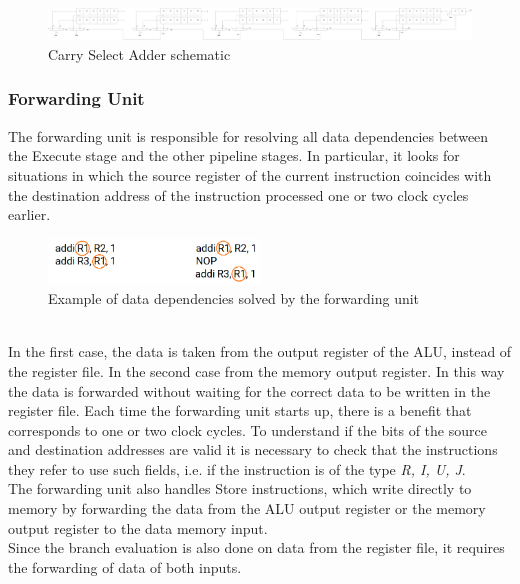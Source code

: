 \begin{figure}[htbp]
	\centering
	\includegraphics[width=1\textwidth]{sec2/images/CSA_full.png }
	\caption{Carry Select Adder schematic}
	\label{fig:CSA_full}
\end{figure}

\subsubsection{Forwarding Unit}
The forwarding unit is responsible for resolving all data dependencies between the Execute stage and the other pipeline stages. In particular, it looks for situations in which the source register of the current instruction coincides with the destination address of the instruction processed one or two clock cycles earlier.
\begin{figure}[htbp]
	\centering
	\includegraphics[width=0.5\textwidth]{sec2/images/data_dependency.png}
	\caption{Example of data dependencies solved by the forwarding unit}
	\label{fig:zero_skipping}
\end{figure}
\\In the first case, the data is taken from the output register of the ALU, instead of the register file. In the second case from the memory output register. In this way the data is forwarded without waiting for the correct data to be written in the register file. Each time the forwarding unit starts up, there is a benefit that corresponds to one or two clock cycles. To understand if the bits of the source and destination addresses are valid it is necessary to check that the instructions they refer to use such fields, i.e. if the instruction is of the type \textit{R, I, U, J}.\\
The forwarding unit also handles Store instructions, which write directly to memory by forwarding the data from the ALU output register or the memory output register to the data memory input.\\
Since the branch evaluation is also done on data from the register file, it requires the forwarding of data of both inputs.
